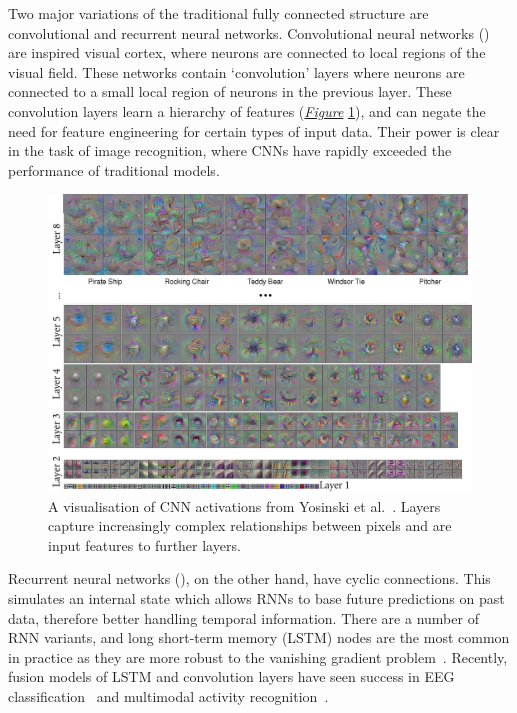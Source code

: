 \documentclass[12pt, twoside]{book}
\renewcommand\emph[1]{\textit{\color{USred}{#1}}}
\begin{document}
Two major variations of the traditional fully connected structure are convolutional and recurrent neural networks. Convolutional neural networks (\emph{CNNs}) are inspired visual cortex, where neurons are connected to local regions of the visual field. These networks contain `convolution' layers where neurons are connected to a small local region of neurons in the previous layer. These convolution layers learn a hierarchy of features (\textit{\hyperref[cnnvis]{Figure}} \ref{cnnvis}), and can negate the need for feature engineering for certain types of input data. Their power is clear in the task of image recognition, where CNNs have rapidly exceeded the performance of traditional models.


\begin{figure}[!htb]
	\centering\includegraphics[width=1\linewidth]{cnnvis.png}
	\caption{A visualisation of CNN activations from Yosinski et al.~\cite{cnnvis}. Layers capture increasingly complex relationships between pixels and are input features to further layers. }
	\label{cnnvis}
	\vspace{-0.4em}
\end{figure}


Recurrent neural networks (\emph{RNNs}), on the other hand, have cyclic connections. This simulates an internal state which allows RNNs to base future predictions on past data, therefore better handling temporal information. There are a number of RNN variants, and long short-term memory (LSTM) nodes are the most common in practice as they are more robust to the vanishing gradient problem~\cite{lstm}. Recently, fusion models of LSTM and convolution layers have seen success in EEG classification~\cite{bashivan2015learning} and multimodal activity recognition~\cite{deepconvlstm}.
\end{document}
